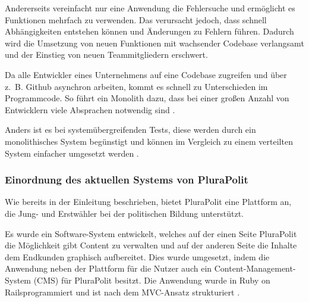 Andererseits vereinfacht nur eine Anwendung die Fehlersuche und ermöglicht es Funktionen mehrfach zu verwenden. Das verursacht jedoch, dass schnell Abhängigkeiten entstehen können und Änderungen zu Fehlern führen. Dadurch wird die Umsetzung von neuen Funktionen mit wachsender Codebase verlangsamt und der Einstieg von neuen Teammitgliedern erschwert.

Da alle Entwickler eines Unternehmens auf eine Codebase zugreifen und über z.~B. Github asynchron arbeiten, kommt es schnell zu Unterschieden im Programmcode. So führt ein Monolith dazu, dass bei einer großen Anzahl von Entwicklern viele Absprachen notwendig sind \parencite[vgl.][Kap. 2.2.4]{newman_monolith_2019}.

Anders ist es bei systemübergreifenden Tests, diese werden durch ein monolithisches System begünstigt und können im Vergleich zu einem verteilten System einfacher umgesetzt werden  \parencite[vgl.][Kap. 2.2.5]{newman_monolith_2019}.

\subsubsection{Einordnung des aktuellen Systems von PluraPolit}
\label{sec:einordnung}

Wie bereits in der Einleitung beschrieben, bietet PluraPolit eine Plattform an, die Jung- und Erstwähler bei der politischen Bildung unterstützt.

Es wurde ein Software-System entwickelt, welches auf der einen Seite PluraPolit die Möglichkeit gibt Content zu verwalten und auf der anderen Seite die Inhalte dem Endkunden graphisch aufbereitet. Dies wurde umgesetzt, indem die Anwendung neben der Plattform für die Nutzer auch ein Content-Management-System (CMS) für PluraPolit besitzt. Die Anwendung wurde in Ruby on Rails\footnotemark programmiert und ist nach dem MVC-Ansatz strukturiert \parencites[vgl.][S. 66 ff.]{hartl_ruby_2016}.


